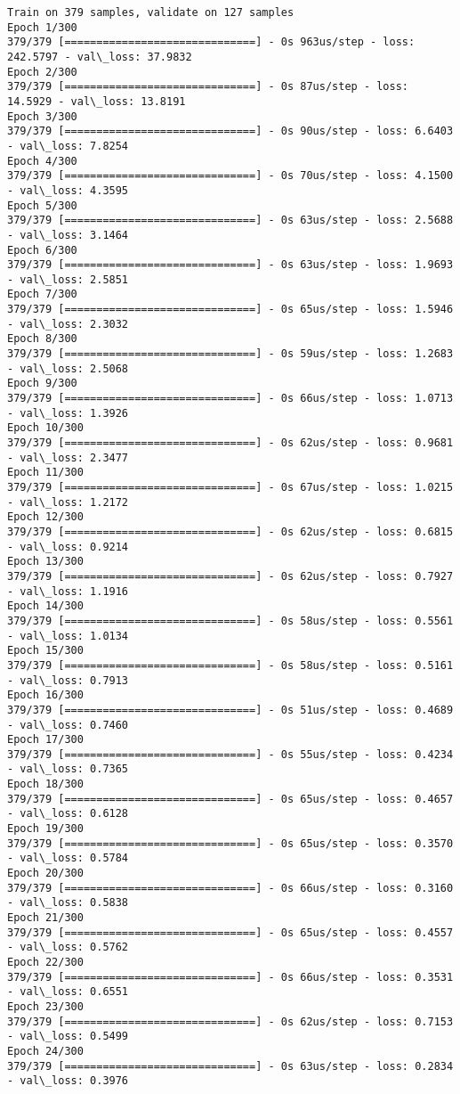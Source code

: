\documentclass[11pt]{article}
\begin{document}
    \begin{Verbatim}[commandchars=\\\{\}]
Train on 379 samples, validate on 127 samples
Epoch 1/300
379/379 [==============================] - 0s 963us/step - loss: 242.5797 - val\_loss: 37.9832
Epoch 2/300
379/379 [==============================] - 0s 87us/step - loss: 14.5929 - val\_loss: 13.8191
Epoch 3/300
379/379 [==============================] - 0s 90us/step - loss: 6.6403 - val\_loss: 7.8254
Epoch 4/300
379/379 [==============================] - 0s 70us/step - loss: 4.1500 - val\_loss: 4.3595
Epoch 5/300
379/379 [==============================] - 0s 63us/step - loss: 2.5688 - val\_loss: 3.1464
Epoch 6/300
379/379 [==============================] - 0s 63us/step - loss: 1.9693 - val\_loss: 2.5851
Epoch 7/300
379/379 [==============================] - 0s 65us/step - loss: 1.5946 - val\_loss: 2.3032
Epoch 8/300
379/379 [==============================] - 0s 59us/step - loss: 1.2683 - val\_loss: 2.5068
Epoch 9/300
379/379 [==============================] - 0s 66us/step - loss: 1.0713 - val\_loss: 1.3926
Epoch 10/300
379/379 [==============================] - 0s 62us/step - loss: 0.9681 - val\_loss: 2.3477
Epoch 11/300
379/379 [==============================] - 0s 67us/step - loss: 1.0215 - val\_loss: 1.2172
Epoch 12/300
379/379 [==============================] - 0s 62us/step - loss: 0.6815 - val\_loss: 0.9214
Epoch 13/300
379/379 [==============================] - 0s 62us/step - loss: 0.7927 - val\_loss: 1.1916
Epoch 14/300
379/379 [==============================] - 0s 58us/step - loss: 0.5561 - val\_loss: 1.0134
Epoch 15/300
379/379 [==============================] - 0s 58us/step - loss: 0.5161 - val\_loss: 0.7913
Epoch 16/300
379/379 [==============================] - 0s 51us/step - loss: 0.4689 - val\_loss: 0.7460
Epoch 17/300
379/379 [==============================] - 0s 55us/step - loss: 0.4234 - val\_loss: 0.7365
Epoch 18/300
379/379 [==============================] - 0s 65us/step - loss: 0.4657 - val\_loss: 0.6128
Epoch 19/300
379/379 [==============================] - 0s 65us/step - loss: 0.3570 - val\_loss: 0.5784
Epoch 20/300
379/379 [==============================] - 0s 66us/step - loss: 0.3160 - val\_loss: 0.5838
Epoch 21/300
379/379 [==============================] - 0s 65us/step - loss: 0.4557 - val\_loss: 0.5762
Epoch 22/300
379/379 [==============================] - 0s 66us/step - loss: 0.3531 - val\_loss: 0.6551
Epoch 23/300
379/379 [==============================] - 0s 62us/step - loss: 0.7153 - val\_loss: 0.5499
Epoch 24/300
379/379 [==============================] - 0s 63us/step - loss: 0.2834 - val\_loss: 0.3976

\end{Verbatim}
\end{document}
